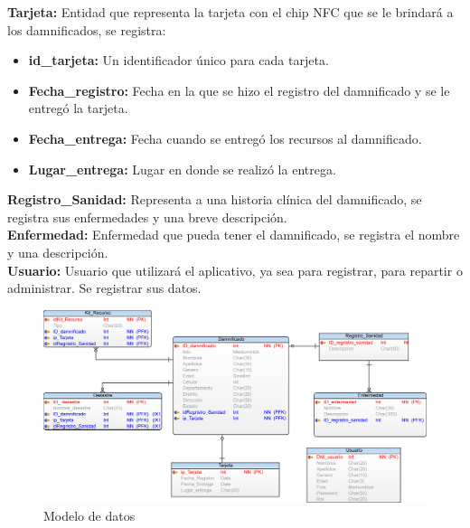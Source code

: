 \documentclass[11pt,openany]{book}
\begin{document}
	\textbf{Tarjeta: }Entidad que representa la tarjeta con el chip NFC que se le brindará a los damnificados, se registra:
	\begin{itemize}
		\item \textbf{id\_tarjeta: }Un identificador único para cada tarjeta.
		\item \textbf{Fecha\_registro: }Fecha en la que se hizo el registro del damnificado y se le entregó la tarjeta.
		\item \textbf{Fecha\_entrega: }Fecha cuando se entregó los recursos al damnificado.
		\item \textbf{Lugar\_entrega: }Lugar en donde se realizó la entrega.
	\end{itemize}
	\textbf{Registro\_Sanidad: }Representa a una historia clínica del damnificado, se registra sus enfermedades y una breve descripción.\\
	\textbf{Enfermedad: }Enfermedad que pueda tener el damnificado, se registra el nombre y una descripción.\\
	\textbf{Usuario: }Usuario que utilizará el aplicativo, ya sea para registrar, para repartir o administrar. Se registrar sus datos.
	\begin{figure}[htbp]
			\centering
			\includegraphics[width=1.1\textwidth]{imagenes/modelo_de_datos.png}
			\caption{Modelo de datos}
			\label{Modelo_de_datos}
	\end{figure}
	\newpage
\end{document}
